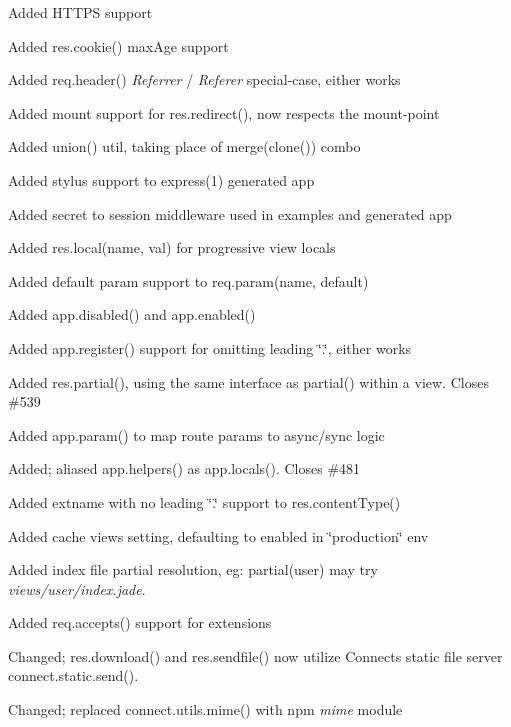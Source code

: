 {\ttfamily 
\begin{DoxyItemize}
\item Added H\+T\+T\+PS support
\item Added {\ttfamily res.\+cookie()} max\+Age support
\item Added {\ttfamily req.\+header()} {\itshape Referrer} / {\itshape Referer} special-\/case, either works
\item Added mount support for {\ttfamily res.\+redirect()}, now respects the mount-\/point
\item Added {\ttfamily union()} util, taking place of {\ttfamily merge(clone())} combo
\item Added stylus support to express(1) generated app
\item Added secret to session middleware used in examples and generated app
\item Added {\ttfamily res.\+local(name, val)} for progressive view locals
\item Added default param support to {\ttfamily req.\+param(name, default)}
\item Added {\ttfamily app.\+disabled()} and {\ttfamily app.\+enabled()}
\item Added {\ttfamily app.\+register()} support for omitting leading \char`\"{}.\char`\"{}, either works
\item Added {\ttfamily res.\+partial()}, using the same interface as {\ttfamily partial()} within a view. Closes \#539
\item Added {\ttfamily app.\+param()} to map route params to async/sync logic
\item Added; aliased {\ttfamily app.\+helpers()} as {\ttfamily app.\+locals()}. Closes \#481
\item Added extname with no leading \char`\"{}.\char`\"{} support to {\ttfamily res.\+content\+Type()}
\item Added {\ttfamily cache views} setting, defaulting to enabled in \char`\"{}production\char`\"{} env
\item Added index file partial resolution, eg\+: partial(\textquotesingle{}user\textquotesingle{}) may try {\itshape views/user/index.\+jade}.
\item Added {\ttfamily req.\+accepts()} support for extensions
\item Changed; {\ttfamily res.\+download()} and {\ttfamily res.\+sendfile()} now utilize Connect\textquotesingle{}s static file server {\ttfamily connect.\+static.\+send()}.
\item Changed; replaced {\ttfamily connect.\+utils.\+mime()} with npm {\itshape mime} module

\end{DoxyItemize}}
